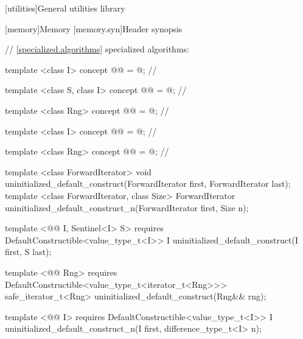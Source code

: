 \setcounter{chapter}{22}
[utilities]{General utilities library}

\setcounter{section}{9}
[memory]{Memory}
\setcounter{subsection}{1}
[memory.syn]{Header  synopsis}

\begin{codeblock}
// \ref{specialized.algorithms} specialized algorithms:
\end{codeblock}
{\color{addclr}
\begin{codeblock}
template <class I>
concept @@ = @\seebelow@; // \expos

template <class S, class I>
concept @@ = @\seebelow@; // \expos

template <class Rng>
concept @@ = @\seebelow@; // \expos

template <class I>
concept @@ = @\seebelow@; // \expos

template <class Rng>
concept @@ = @\seebelow@; // \expos
\end{codeblock}
} %

{\color{remclr}
\begin{codeblock}
template <class ForwardIterator>
  void uninitialized_default_construct(ForwardIterator first, ForwardIterator last);
template <class ForwardIterator, class Size>
  ForwardIterator uninitialized_default_construct_n(ForwardIterator first, Size n);
\end{codeblock}
} %
{\color{addclr}
\begin{codeblock}
template <@@ I, Sentinel<I> S>
  requires
DefaultConstructible<value_type_t<I>>
  I uninitialized_default_construct(I first, S last);

template <@@ Rng>
  requires
DefaultConstructible<value_type_t<iterator_t<Rng>>>
  safe_iterator_t<Rng> uninitialized_default_construct(Rng&& rng);

template <@@ I>
  requires
DefaultConstructible<value_type_t<I>>
  I uninitialized_default_construct_n(I first, difference_type_t<I> n);
\end{codeblock}
} %

